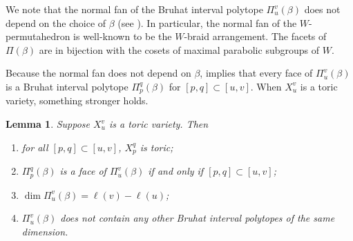 \documentclass[11pt]{amsart}
\newtheorem{lemma}[Thm]{Lemma}
\theoremstyle{definition}
\def\pt{\beta}
\begin{document}
We note that the normal fan of the Bruhat interval polytope $\Pi_u^v(\pt)$ does not depend on the choice of $\pt$ (see \cite[Lemma 7.2]{BDLSB}). In particular, the normal fan of the $W$-permutahedron is well-known to be the $W$-braid arrangement. The facets of $\Pi(\pt)$ are in bijection with the cosets of maximal parabolic subgroups of $W$.

Because the normal fan does not depend on $\pt$, \cite[Theorem 7.13]{TW15} implies that every face of $\Pi_u^v(\pt)$ is a Bruhat interval polytope $\Pi_p^q(\pt)$ for $[p, q] \subset [u,v]$. When $X_u^v$ is a toric variety, something stronger holds.


\begin{lemma}\label{lem:toric-BIP-facts}
	Suppose $X_u^v$ is a toric variety. Then 
	\begin{enumerate}
		\item for all $[p, q] \subset [u,v]$, $X_p^q$ is toric;
		\item $\Pi_p^q(\pt)$ is a face of $\Pi_u^v(\pt)$ if and only if $[p, q] \subset [u,v]$;
		\item $\dim \Pi_u^v(\pt) = \ell(v)-\ell(u)$;
		\item $\Pi_u^v(\pt)$ does not contain any other Bruhat interval polytopes of the same dimension.
	\end{enumerate}
\end{lemma}
\end{document}
